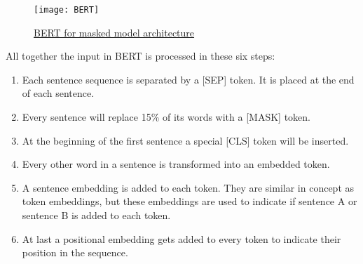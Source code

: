 \begin{figure}[!htb]
    \texttt{[image: BERT]}
    \caption{\href{https://media.arxiv-vanity.com/render-output/5396393/MLM_LS.png}{BERT for masked model architecture} }
\end{figure}
\pagebreak
All together the input in BERT is processed in these six steps: 
\begin{enumerate}
    \item Each sentence sequence is separated by a [SEP] token. It is placed at the end of each sentence.
    \item Every sentence will replace 15\% of its words with a [MASK] token.
    \item At the beginning of the first sentence a special [CLS] token will be inserted.
    \item Every other word in a sentence is transformed into an embedded token.
    \item A sentence embedding is added to each token. They are similar in concept as token embeddings, but these embeddings are used to indicate if sentence A or sentence B is added to each token.
    \item At last a positional embedding gets added to every token to indicate their position in the sequence.
\end{enumerate}
